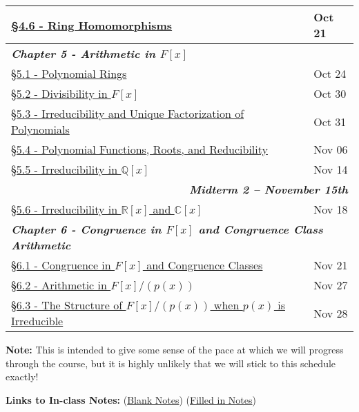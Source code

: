 \documentclass{article}
\newcommand{\chaptercolor}{RoyalBlue!35}
\newcommand{\testcolor}{Bittersweet!25}
\begin{document}
\begin{center}
\begin{tabular}{|l|l|}
\href{}{\S4.6 - Ring Homomorphisms} & Oct 21\\
\hline
\multicolumn{2}{|l|}{\cellcolor{\chaptercolor} \textit{\textbf{Chapter 5 - Arithmetic in $F[x]$}}}\\
\hline
\href{}{\S5.1 - Polynomial Rings} & Oct 24\\
\href{}{\S5.2 - Divisibility in $F[x]$} & Oct 30\\
\href{}{\S5.3 - Irreducibility and Unique Factorization of Polynomials} & Oct 31\\
\href{}{\S5.4 - Polynomial Functions, Roots, and Reducibility} & Nov 06\\
\href{}{\S5.5 - Irreducibility in $\mathbb{Q}[x]$} & Nov 14\\
\hline
\multicolumn{2}{|r|}{\cellcolor{\testcolor} \textit{\textbf{Midterm 2 -- November 15th}}}\\
\hline
\href{}{\S5.6 - Irreducibility in $\mathbb{R}[x]$ and $\mathbb{C}[x]$} & Nov 18\\
\hline
\multicolumn{2}{|l|}{\cellcolor{\chaptercolor} \textit{\textbf{Chapter 6 - Congruence in $F[x]$ and Congruence Class Arithmetic}}}\\
\hline
\href{}{\S6.1 - Congruence in $F[x]$ and Congruence Classes} & Nov 21\\
\href{}{\S6.2 - Arithmetic in $F[x]/(p(x))$} & Nov 27\\
\href{}{\S6.3 - The Structure of $F[x]/(p(x))$ when $p(x)$ is Irreducible} & Nov 28\\
\hline
\end{tabular}
\end{center}
\noindent \textbf{Note:} This is intended to give some sense of the pace at which we will progress through the course, but it is highly unlikely that we will stick to this schedule exactly!
\vspace{0.5cm}

\noindent \textbf{Links to In-class Notes:} (\href{https://drive.google.com/drive/folders/1j3_NlLeEWDfUdb6o_Q65p8j3BRY4OwCj?usp=sharing}{Blank Notes}) (\href{https://drive.google.com/drive/folders/1B48PHZ0_VBcYyOEbI7n_Gp8CWuJv0i6r?usp=sharing}{Filled in Notes})
\end{document}

